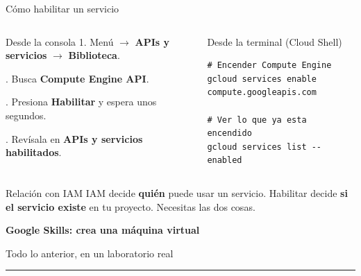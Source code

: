 \documentclass[aspectratio=169,10pt,c]{beamer}
\begin{document}
\begin{frame}[fragile]{Cómo habilitar un servicio}
\begin{columns}[T,onlytextwidth]
\begin{exampleblock}{Desde la consola}
\small
1. Menú $\rightarrow$ \textbf{APIs y servicios} $\rightarrow$ \textbf{Biblioteca}.\par{}. Busca \textbf{Compute Engine API}.\par{}. Presiona \textbf{Habilitar} y espera unos segundos.\par{}. Revísala en \textbf{APIs y servicios habilitados}.
\end{exampleblock}
\begin{exampleblock}{Desde la terminal (Cloud Shell)}
\begin{lstlisting}
# Encender Compute Engine
gcloud services enable compute.googleapis.com

# Ver lo que ya esta encendido
gcloud services list --enabled
\end{lstlisting}
\end{exampleblock}
\end{columns}
\par\vspace{2mm}
\begin{block}{Relación con IAM}
\small IAM decide \textbf{quién} puede usar un servicio. Habilitar decide \textbf{si el servicio existe} en tu proyecto. Necesitas las dos cosas.
\end{block}
\end{frame}

\begin{frame}[plain]
\vfill
\begin{center}
{\fontsize{29}{34}\selectfont\bfseries Google Skills: crea una máquina virtual}\par
\vspace{2mm}
{\small Todo lo anterior, en un laboratorio real}\par
\vspace{4mm}
{\color{utpRojo}\rule{8.5cm}{1.2pt}}
\end{center}
\vfill
\end{frame}
\end{document}
